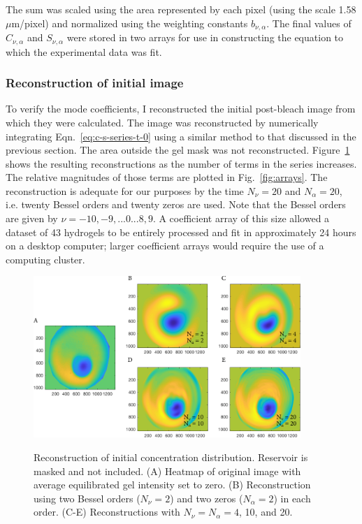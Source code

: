 The sum was scaled using the area represented by each pixel (using the scale 1.58 $\mu$m/pixel) and normalized using the weighting constants $b_{\nu,\alpha}$.  The final values of $C_{\nu,\alpha}$ and $S_{\nu,\alpha}$ were stored in two arrays for use in constructing the equation to which the experimental data was fit.


\subsubsection{Reconstruction of initial image}

To verify the mode coefficients, I reconstructed the initial post-bleach image from which they were calculated.  The image was reconstructed by numerically integrating Eqn.~\ref{eq:c-s-series-t-0} using a similar method to that discussed in the previous section.  The area outside the gel mask was not reconstructed.  Figure~\ref{fig:initDist} shows the resulting reconstructions as the number of terms in the series increases.  The relative magnitudes of those terms are plotted in Fig.~\ref{fig:arrays}.  The reconstruction is adequate for our purposes by the time $N_\nu = 20$ and $N_\alpha = 20$, i.e. twenty Bessel orders and twenty zeros are used.  Note that the Bessel orders are given by $\nu = -10,-9,...0...8,9$.  A coefficient array of this size allowed a dataset of 43 hydrogels to be entirely processed and fit in approximately 24 hours on a desktop computer; larger coefficient arrays would require the use of a computing cluster.

\begin{figure}
\caption{Reconstruction of initial concentration distribution. Reservoir is masked and not included.  (A) Heatmap of original image with average equilibrated gel intensity set to zero. (B) Reconstruction using two Bessel orders ($N_\nu = 2$) and two zeros ($N_\alpha = 2$) in each order. (C-E) Reconstructions with $N_\nu = N_\alpha = 4$, 10, and 20.}
\centering
\includegraphics[width=0.9\textwidth]{figs/ch04/reconstruction-16_2_4_10_20.pdf}
\label{fig:initDist}
\end{figure} 

